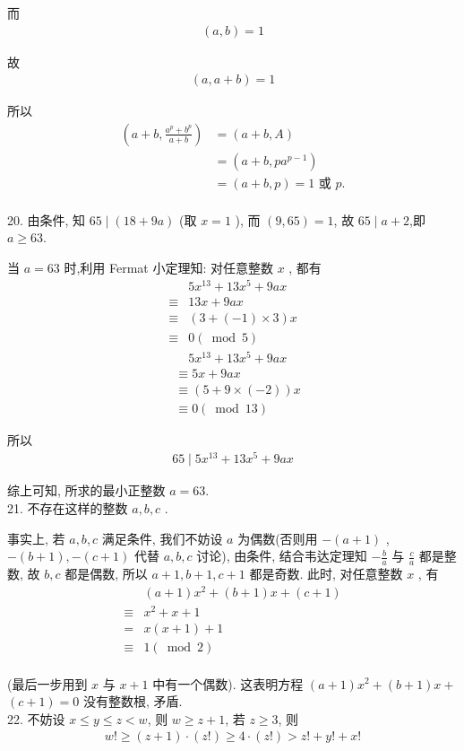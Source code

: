 而
\begin{align*}
	(a, b)=1
\end{align*}

故
\begin{align*}
	(a, a+b)=1
\end{align*}

所以\begin{align}
	\left(a+b, \frac{a^{p}+b^{p}}{a+b}\right) & =(a+b, A)                    \\
	                                          & =\left(a+b, p a^{p-1}\right) \\
	                                          & =(a+b, p)=1 \text { 或 } p .
\end{align}\\
20. 由条件, 知 $65 \mid(18+9 a)$ (取 $x=1$ ), 而 $(9,65)=1$, 故 $65 \mid a+2$,即 $a \geqslant 63$.

当 $a=63$ 时,利用 Fermat 小定理知: 对任意整数 $x$ , 都有\begin{align}
	       & 5 x^{13}+13 x^{5}+9 a x \\
	\equiv & 13 x+9 a x              \\
	\equiv & (3+(-1) \times 3) x     \\
	\equiv & 0(\bmod 5)              \\
	       & 5 x^{13}+13 x^{5}+9 a x
\end{align}\begin{align}
	 & \equiv 5 x+9 a x         \\
	 & \equiv(5+9 \times(-2)) x \\
	 & \equiv 0(\bmod 13)
\end{align}

所以
\begin{align*}
	65 \mid 5 x^{13}+13 x^{5}+9 a x
\end{align*}

综上可知, 所求的最小正整数 $a=63$.\\
21. 不存在这样的整数 $a ,  b ,  c$ .

事实上, 若 $a ,  b ,  c$ 满足条件, 我们不妨设 $a$ 为偶数(否则用 $-(a+1)$ ,  $-(b+1) , -(c+1)$ 代替 $a ,  b ,  c$ 讨论), 由条件, 结合韦达定理知 $-\frac{b}{a}$ 与 $\frac{c}{a}$ 都是整数, 故 $b ,  c$ 都是偶数, 所以 $a+1 ,  b+1 ,  c+1$ 都是奇数. 此时, 对任意整数 $x$ , 有\begin{align}
	       & (a+1) x^{2}+(b+1) x+(c+1) \\
	\equiv & x^{2}+x+1                 \\
	=      & x(x+1)+1                  \\
	\equiv & 1(\bmod 2)
\end{align}\\
(最后一步用到 $x$ 与 $x+1$ 中有一个偶数). 这表明方程 $(a+1) x^{2}+(b+1) x+$ $(c+1)=0$ 没有整数根, 矛盾. \\
22. 不妨设 $x \leqslant y \leqslant z<w$, 则 $w \geqslant z+1$, 若 $z \geqslant 3$, 则
\begin{align*}
	w!\geqslant(z+1) \cdot(z!) \geqslant 4 \cdot(z!)>z!+y!+x!
\end{align*}

